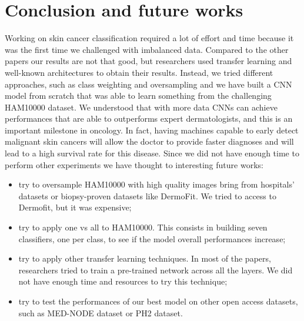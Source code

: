 \section{Conclusion and future works} \label{conclusion}
	
	Working on skin cancer classification required a lot of effort and time because it was the first time we challenged with imbalanced data. 
	Compared to the other papers our results are not that good, but researchers used transfer learning and well-known architectures to obtain their results. Instead, we tried different approaches, such as class weighting and oversampling and we have built a CNN model from scratch that was able to learn something from the challenging HAM10000 dataset. 
	We understood that with more data CNNs can achieve performances that are able to outperforms expert dermatologists, and this is an important milestone in oncology. In fact, having machines capable to early detect malignant skin cancers will allow the doctor to provide faster diagnoses and will lead to a high survival rate for this disease. Since we did not have enough time to perform other experiments we have thought to interesting future works:

	\begin{itemize}
		\item try to oversample HAM10000 with high quality images bring from hospitals' datasets or biopsy-proven datasets like DermoFit\cite{dermofit}. We tried to access to Dermofit, but it was expensive;
		\item try to apply one vs all to HAM10000. This consists in building seven classifiers, one per class, to see if the model overall performances increase;
		\item try to apply other transfer learning techniques. In most of the papers, researchers tried to train a pre-trained network across all the layers. We did not have enough time and resources to try this technique;
		\item try to test the performances of our best model on other open access datasets, such as MED-NODE dataset\cite{mednode} or PH2 dataset. 	
	\end{itemize}
